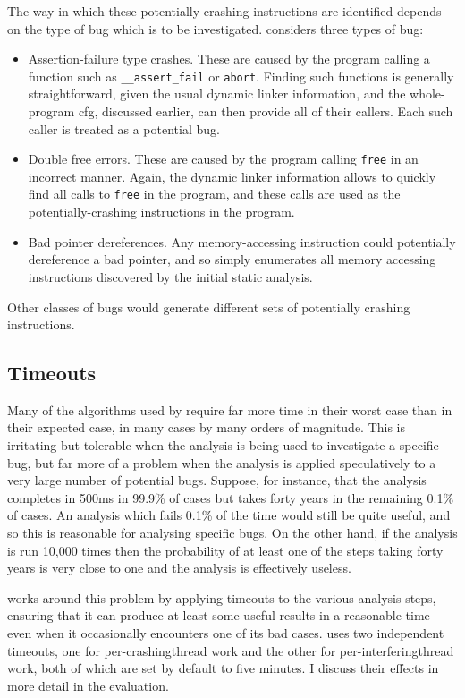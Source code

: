 The way in which these potentially-crashing instructions are
identified depends on the type of bug which is to be investigated.
{\Implementation} considers three types of bug:
\begin{itemize}
\item Assertion-failure type crashes.  These are caused by the program
  calling a function such as \verb|__assert_fail| or \verb|abort|.
  Finding such functions is generally straightforward, given the usual
  dynamic linker information, and the whole-program \gls{cfg},
  discussed earlier, can then provide all of their callers.  Each such
  caller is treated as a potential bug.
\item Double free errors.  These are caused by the program calling
  \verb|free| in an incorrect manner.  Again, the dynamic linker
  information allows {\implementation} to quickly find all calls to
  \verb|free| in the program, and these calls are used as the
  potentially-crashing instructions in the program.
\item Bad pointer dereferences.  Any memory-accessing instruction
  could potentially dereference a bad pointer, and so
  {\implementation} simply enumerates all memory accessing
  instructions discovered by the initial static analysis.
\end{itemize}
Other classes of bugs would generate different sets of potentially
crashing instructions.

\subsection{Timeouts}

Many of the algorithms used by {\technique} require far more time in
their worst case than in their expected case, in many cases by many
orders of magnitude.  This is irritating but tolerable when the
analysis is being used to investigate a specific bug, but far more of
a problem when the analysis is applied speculatively to a very large
number of potential bugs.  Suppose, for instance, that the analysis
completes in 500ms in 99.9\% of cases but takes forty years in the
remaining 0.1\% of cases.  An analysis which fails 0.1\% of the time
would still be quite useful, and so this is reasonable for analysing
specific bugs.  On the other hand, if the analysis is run 10,000 times
then the probability of at least one of the steps taking forty years
is very close to one and the analysis is effectively useless.

{\Technique} works around this problem by applying timeouts to the
various analysis steps, ensuring that it can produce at least some
useful results in a reasonable time even when it occasionally
encounters one of its bad cases.  {\Implementation} uses two
independent timeouts, one for per-\gls{crashingthread} work and the
other for per-\gls{interferingthread} work, both of which are set by
default to five minutes.  I discuss their effects in more detail in
the evaluation.

